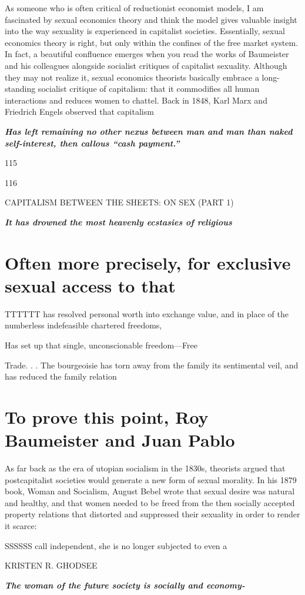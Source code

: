  \par 
As someone who is often critical of reductionist economist models, I am fascinated by sexual economics theory and think the model gives valuable insight into the way sexuality is experienced in capitalist societies. Essentially, sexual economics theory is right, but only within the confines of the free market system. In fact, a beautiful confluence emerges when you read the works of Baumeister and his colleagues alongside socialist critiques of capitalist sexuality. Although they may not realize it, sexual economics theorists basically embrace a long-standing socialist critique of capitalism: that it commodifies all human interactions and reduces women to chattel. Back in 1848, Karl Marx and Friedrich Engels observed that capitalism
 \par 
\textit\textbf{ {Has left remaining no other nexus between man and man than naked self-interest, then callous “cash payment.”} }
 \par 
115
 \par 
116
 \par 
CAPITALISM BETWEEN THE SHEETS: ON SEX (PART {\color{blue}1})
 \par 
\textit\textbf{ {It has drowned the most heavenly ecstasies of religious} }
 \par 
\section{Often more precisely, for exclusive sexual access to that}
 \par 
TTTTTT has resolved personal worth into exchange value, and in place of the numberless indefeasible chartered freedoms,
 \par 
Has set up that single, unconscionable freedom—Free
 \par 
Trade. . . The bourgeoisie has torn away from the family its sentimental veil, and has reduced the family relation
 \par 
\section{To prove this point, Roy Baumeister and Juan Pablo}
 \par 
As far back as the era of utopian socialism in the 1830s, theorists argued that postcapitalist societies would generate a new form of sexual morality. In his 1879 book, Woman and Socialism, August Bebel wrote that sexual desire was natural and healthy, and that women needed to be freed from the then socially accepted property relations that distorted and suppressed their sexuality in order to render it scarce:
 \par 
SSSSSS call independent, she is no longer subjected to even a
 \par 
KRISTEN R. GHODSEE
 \par 
\textit\textbf{ {The woman of the future society is socially and economy-} }
 \par 
